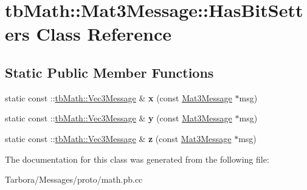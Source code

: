 \hypertarget{classtbMath_1_1Mat3Message_1_1HasBitSetters}{}\section{tb\+Math\+:\+:Mat3\+Message\+:\+:Has\+Bit\+Setters Class Reference}
\label{classtbMath_1_1Mat3Message_1_1HasBitSetters}
\subsection*{Static Public Member Functions}
\begin{DoxyCompactItemize}
\item 
\mbox{\label{classtbMath_1_1Mat3Message_1_1HasBitSetters_adad09d47afb896dab1237f4061077bbf}} 
static const \+::\hyperlink{classtbMath_1_1Vec3Message}{tb\+Math\+::\+Vec3\+Message} \& {\bfseries x} (const \hyperlink{classtbMath_1_1Mat3Message}{Mat3\+Message} $\ast$msg)
\item 
\mbox{\label{classtbMath_1_1Mat3Message_1_1HasBitSetters_a334035607deb380239bfaf78b22b3c49}} 
static const \+::\hyperlink{classtbMath_1_1Vec3Message}{tb\+Math\+::\+Vec3\+Message} \& {\bfseries y} (const \hyperlink{classtbMath_1_1Mat3Message}{Mat3\+Message} $\ast$msg)
\item 
\mbox{\label{classtbMath_1_1Mat3Message_1_1HasBitSetters_a5fbf0c47721d00ea0b24db57cf2cf259}} 
static const \+::\hyperlink{classtbMath_1_1Vec3Message}{tb\+Math\+::\+Vec3\+Message} \& {\bfseries z} (const \hyperlink{classtbMath_1_1Mat3Message}{Mat3\+Message} $\ast$msg)
\end{DoxyCompactItemize}


The documentation for this class was generated from the following file\+:\begin{DoxyCompactItemize}
\item 
Tarbora/\+Messages/proto/math.\+pb.\+cc\end{DoxyCompactItemize}
